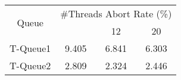 \begin{tabular}{|c|c|c|c|}
\hline
\multirow{2}{*}{Queue} & \multicolumn{3}{c|}{\#Threads Abort Rate (\%)}\\\cline{2-4}& \quad 4 & 12 & 20\\
\hline
\hline
T-Queue1 & 9.405 & 6.841 & 6.303\\
T-Queue2 & 2.809 & 2.324 & 2.446\\
\hline\end{tabular}
